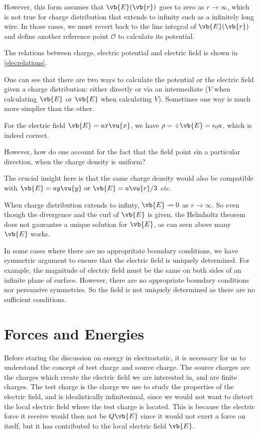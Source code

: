 \documentclass[english,a4paper,12pt]{report}
\begin{document}
However, this form assumes that \(\vb{E} (\vb{r} )\) goes to zero as \(r \to \infty\), which is not true for charge distribution that extends to infinity such as a infinitely long wire. In those cases, we must revert back to the line integral of \(\vb{E} (\vb{r} )\) and define another reference point \(\mathcal{O}\) to calculate its potential.     

The relations between charge, electric potential and electric field is shown in \cref{elecrelations}. 


One can see that there are two ways to calculate the potential or the electric field given a charge distribution: either directly or via an intermediate (\(V\) when calculating \(\vb{E} \) or \(\vb{E} \) when calculating \(V\)). Sometimes one way is much more simplier than the other. 

{For the electric field \(\vb{E}  = ax \vu{x} \), we have \(\rho = \div{\vb{E} } = \epsilon _0 a\), which is indeed correct.  

However, how do one account for the fact that the field point sin a particular direction, when the charge density is uniform?}
{The crucial insight here is that the same charge density would also be compatible with \( \vb{E}  = ay \vu{y} \text { or }  \vb{E}  = a\vu{r}/3\)\textit{ etc.}

When charge distribution extends to infinty, \(\vb{E} \nrightarrow 0\) as \(r \to \infty\). So even though the divergence and the curl of \(\vb{E} \) is given, the Helmholtz theorem does not gaurantee a unique solution for \(\vb{E}\), as can seen above many \(\vb{E} \) works.

In some cases where there are no appropritate boundary conditions, we have symmetric argument to ensure that the electric field is uniquely determined. For example, the magnitude of electric field must be the same on both sides of an infinite plane of surface. However, there are no appropriate boundary conditions nor persuasive symmetries. So the field is not uniquely determined as there are no sufficient conditions.} 

\section{Forces and Energies}

Before staring the discussion on energy in electrostatic, it is necessary for us to understand the concept of test charge and source charge. The source charges are the charges which create the electric field we are interested in, and are finite charges. The test charge is the charge we use to study the properties of the electric field, and is idealistically infinitesimal, since we would not want to distort the local electric field where the test charge is located. This is because the electric force it receive would then not be \(Q\vb{E} \) since it would not exert a force on itself, but it has contributed to the local electric field \(\vb{E} \).  
\end{document}
